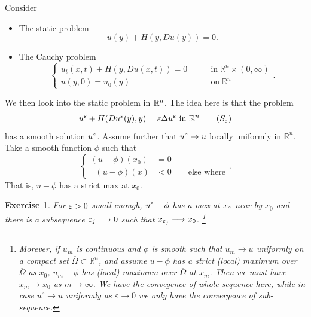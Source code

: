\documentclass[12pt, oneside]{amsart}  	%
\newtheorem{exercise}{Exercise}
\begin{document}
Consider
\begin{itemize}
\item The static problem 
\begin{equation}\label{S}
	u(y)+H(y,Du(y))=0 \tag{S}.
\end{equation}
\item The Cauchy problem 
\begin{equation}\label{C}
\begin{cases}
u_t(x,t) + H(y,Du(x,t)) = 0 &\qquad\text{in}\;\mathbb{R}^n\times (0,\infty)\\
u(y,0)  = u_0(y) &\qquad\text{on}\;\mathbb{R}^n
\end{cases} \tag{$C$}.
\end{equation}
\end{itemize}



We then look into the static problem in $\mathbb{R}^n$. The idea here is that the problem
\begin{equation}\label{S_varepsilon}
	u^\varepsilon + H(Du^\varepsilon(y), y)=\varepsilon\Delta u^\varepsilon \text{ in } \mathbb{R}^n \tag{$S_\varepsilon$}
\end{equation}
has a smooth solution $u^\varepsilon$. Assume further that $u^\varepsilon \to u$ locally uniformly in $\mathbb{R}^n$. %
Take a smooth function $\phi$ such that %
\begin{equation*}
	\begin{cases}
		(u-\phi)(x_0)&=0\\
	\;\;	(u - \phi)(x) &< 0 \qquad\text{else where}
	\end{cases}.
\end{equation*}
That is, $u-\phi$ has a strict max at $x_0$.
\begin{exercise}\label{exercise1}
For $\varepsilon>0$ small enough, $u^\varepsilon -\phi$ has a max at $x_\varepsilon$ near by $x_0$ and there is a subsequence $\varepsilon_j\longrightarrow 0$ such that $x_{\varepsilon_j}\longrightarrow x_0$. \footnote{Morever, if  $u_m$ is continuous and $\phi$ is smooth such that $u_m \longrightarrow u$ uniformly on a compact set $\overline{\Omega}\subset\mathbb{R}^n$, and assume $u - \phi$ has a strict (local) maximum over $\overline{\Omega}$ as $x_0$, $u_m - \phi$ has (local) maximum over $\overline{\Omega}$ at $x_m$. Then we must have $x_m\longrightarrow  x_0$ as $m\longrightarrow\infty$. We have the convegence of whole sequence here, while in case $u^{\varepsilon}\longrightarrow u$ uniformly as $\varepsilon\longrightarrow 0$ we only have the convergence of sub-sequence.}
\end{exercise}
\end{document}
